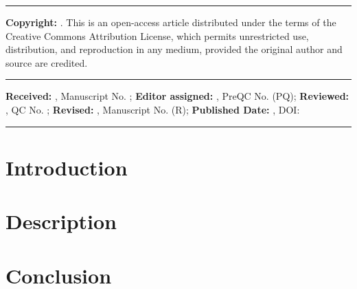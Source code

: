 \documentclass[9pt,twocolumn]{extarticle}
\newcommand{\datesfont}{\fontsize{8}{9.6}\robotoCondensedfont\selectfont}
\newcommand{\copyrightfont}{\fontsize{8}{9.6}\robotoCondensedfont\selectfont}
\begin{document}
\vspace{1pt}
\noindent\rule{\linewidth}{0.4pt}\par
\vspace{1pt}

{\copyrightfont\bfseries Copyright:} {\copyrightfont {} . This is an open-access article distributed under the terms of the Creative Commons Attribution License, which permits unrestricted use, distribution, and reproduction in any medium, provided the original author and source are credited.}

\vspace{1pt}
\noindent\rule{\linewidth}{0.4pt}\par
\vspace{1pt}

{\datesfont \textbf{Received:} , Manuscript No. ; \textbf{Editor assigned:} , PreQC No. (PQ); \textbf{Reviewed:} , QC No. ; \textbf{Revised:} , Manuscript No. (R); \textbf{Published Date:} , DOI: }

\vspace{1pt}
\noindent\rule{\linewidth}{0.4pt}\par

\section*{Introduction}
\begin{otherlanguage}{\VAR{lang_name}}
\end{otherlanguage}

\section*{Description}
\begin{otherlanguage}{\VAR{lang_name}}
\end{otherlanguage}

\section*{Conclusion}
\begin{otherlanguage}{\VAR{lang_name}}
\end{otherlanguage}
\end{document}
